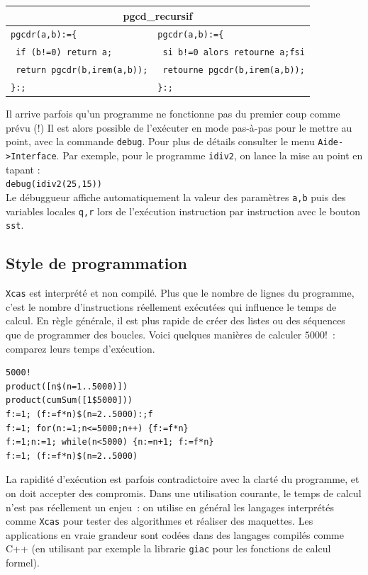 \documentclass{article}
\begin{document}

\begin{center}
\begin{tabular}{|l|l|}
\hline
\multicolumn{2}{|c|}{\bf pgcd\_recursif}\\
\hline\hline
\verb+pgcdr(a,b):={+ &\verb+pgcdr(a,b):={+\\
\verb+ if (b!=0) return a;+&\verb+ si b!=0 alors retourne a;fsi+\\
\verb+ return pgcdr(b,irem(a,b));+&\verb+ retourne pgcdr(b,irem(a,b));+\\
\verb+}:;+&\verb+}:;+\\
\hline
\end{tabular}
\end{center}

%

Il arrive parfois qu'un programme ne fonctionne pas du premier coup 
comme pr\'evu (!)  
Il est alors possible de l'ex\'ecuter en mode pas-\`a-pas pour le mettre 
au point, avec la 
commande \verb|debug|. Pour plus de d\'etails consulter le menu
\verb|Aide->Interface|. Par exemple, pour le programme \verb|idiv2|,
on lance la mise au point en tapant :\\
\verb|debug(idiv2(25,15))|\\
Le d\'ebuggueur affiche automatiquement la valeur des param\`etres \verb|a,b| puis
des variables locales \verb|q,r| lors de l'ex\'ecution instruction par 
instruction avec le bouton \verb|sst|.
%
\subsection{Style de programmation}
%
{\tt Xcas} est interpr\'et\'e et non compil\'e.
Plus que le nombre de lignes du programme, c'est le nombre
d'instructions r\'eellement ex\'ecut\'ees qui influence le temps de calcul.
En r\`egle g\'en\'erale, il est plus rapide de cr\'eer des listes
ou des s\'equences que de programmer des boucles. 
Voici quelques mani\`eres de calculer
$5000!$~: comparez leurs temps d'ex\'ecution.
\begin{verbatim}
5000!
product([n$(n=1..5000)])
product(cumSum([1$5000]))
f:=1; (f:=f*n)$(n=2..5000):;f
f:=1; for(n:=1;n<=5000;n++) {f:=f*n}
f:=1;n:=1; while(n<5000) {n:=n+1; f:=f*n}
f:=1; (f:=f*n)$(n=2..5000)
\end{verbatim}
La rapidit\'e d'ex\'ecution est parfois contradictoire avec la
clart\'e du programme, et on doit accepter des compromis. Dans une
utilisation courante, le temps de calcul n'est pas r\'eellement un enjeu~: 
on utilise en g\'en\'eral les langages
interpr\'et\'es comme {\tt Xcas} pour tester des algorithmes et r\'ealiser des
maquettes. Les applications en vraie grandeur sont cod\'ees dans des
langages compil\'es comme C++ (en utilisant par exemple la librarie
\verb|giac| pour les fonctions de calcul formel).
\end{document}
